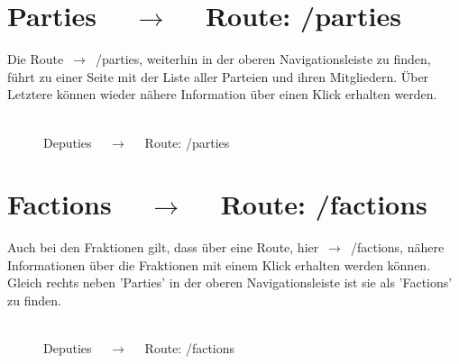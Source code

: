 \documentclass[10pt]{report}
\begin{document}
\section{Parties $\quad\rightarrow\quad$  Route:  /parties}
Die Route $\,\rightarrow\,$ /parties, weiterhin in der oberen Navigationsleiste zu finden, führt zu einer Seite mit der Liste aller Parteien und ihren Mitgliedern. Über Letztere können wieder nähere Information über einen Klick erhalten werden.\\\\

\begin{figure}[H]
	\begin{center}		
  	 \end{center}
	\caption{Deputies $\quad\rightarrow\quad$  Route:  /parties}	
\end{figure}


\section{Factions $\quad\rightarrow\quad$  Route:  /factions}  
Auch bei den Fraktionen gilt, dass über eine Route, hier $\,\rightarrow\,$ /factions, nähere Informationen über die Fraktionen mit einem Klick erhalten werden können. Gleich rechts neben 'Parties' in der oberen Navigationsleiste ist sie als 'Factions' zu finden.\\\\

\begin{figure}[H]
	\begin{center}		
  	 \end{center}
	\caption{Deputies $\quad\rightarrow\quad$  Route:  /factions}	
\end{figure}
\end{document}
